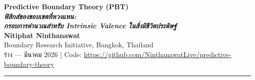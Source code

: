 \documentclass[12pt,a4paper]{article}
\begin{document}
\begin{center}
{\LARGE\bfseries\color{pbtblue}
  Predictive Boundary Theory (PBT)\\[8pt]
  \large\normalfont\itshape
  ฟิสิกส์ของขอบเขตที่หวงแหน:\\
  กรอบการคำนวณสำหรับ Intrinsic Valence ในสิ่งมีชีวิตประดิษฐ์
}\\[14pt]
{\large\bfseries Nitiphat Ninthanawat}\\[4pt]
{\normalsize Boundary Research Initiative, Bangkok, Thailand}\\[4pt]
{\small ร่าง --- มีนาคม 2026 \quad|\quad
  Code: \url{https://github.com/NinthanawatLive/predictive-boundary-theory}}
\end{center}
\vspace{4pt}\hrule\vspace{8pt}
\end{document}
